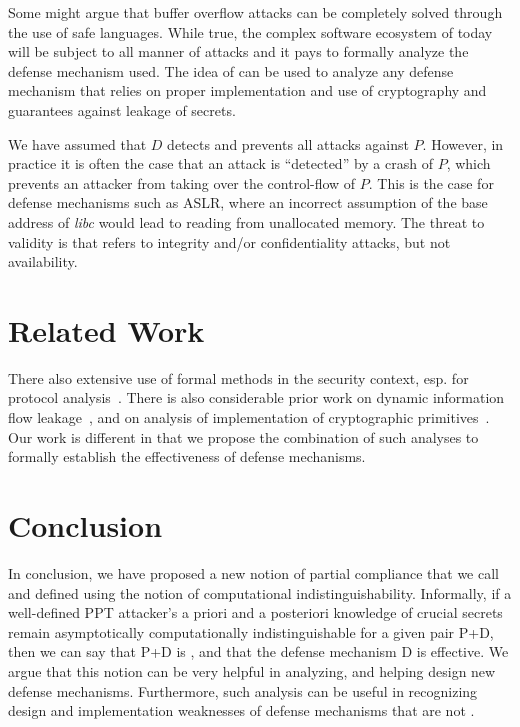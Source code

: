  Some might argue that
buffer overflow attacks can be completely solved through the use of
safe languages. While true, the complex software ecosystem of today
will be subject to all manner of attacks and it pays to formally
analyze the defense mechanism used. The idea of \resistance can be
used to analyze any defense mechanism that relies on proper
implementation and use of cryptography and guarantees against leakage
of secrets.

 We have assumed that $D$
detects and prevents all attacks against $P$. However, in practice it 
is often the case that an attack is ``detected'' by a crash of $P$, which 
prevents an attacker from taking over the control-flow of $P$. This is
the case for defense mechanisms such as ASLR, where an incorrect 
assumption of the base address of \emph{libc} would lead to reading 
from unallocated memory. The threat to validity is that \resistance 
refers to integrity and/or confidentiality attacks, but not availability.


\section {Related Work}

There also extensive use of formal methods in the security context,
esp. for protocol analysis~\cite{datta2007protocol}. There is also
considerable prior work on dynamic information flow
leakage~\cite{schwartz2010all}, and on analysis of implementation of
cryptographic primitives~\cite{appelverification}. Our work is
different in that we propose the combination of such analyses to
formally establish the effectiveness of defense mechanisms.

\section{Conclusion}

In conclusion, we have proposed a new notion of partial compliance
that we call \resistance and defined using the notion of computational
indistinguishability. Informally, if a well-defined PPT attacker's a
priori and a posteriori knowledge of crucial secrets remain
asymptotically computationally indistinguishable for a given pair P+D,
then we can say that P+D is \resistant, and that the defense mechanism
D is effective. We argue that this notion can be very helpful in
analyzing, and helping design new defense mechanisms. Furthermore,
such analysis can be useful in recognizing design and implementation
weaknesses of defense mechanisms that are not \resistant.

